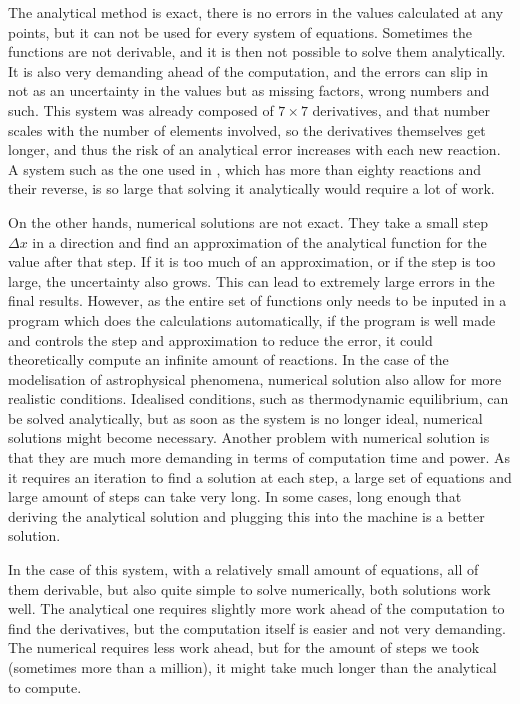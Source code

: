 \documentclass[a4paper, 12pt]{article}
\begin{document}
The analytical method is exact, there is no errors in the values calculated at any points, but it can not be used for every system of equations. Sometimes the functions are not derivable, and it is then not possible to solve them analytically. It is also very demanding ahead of the computation, and the errors can slip in not as an uncertainty in the values but as missing factors, wrong numbers and such. This system was already composed of $7\times 7$ derivatives, and that number scales with the number of elements involved, so the derivatives themselves get longer, and thus the risk of an analytical error increases with each new reaction. A system such as the one used in \cite{wagoner_synthesis_1967}, which has more than eighty reactions and their reverse, is so large that solving it analytically would require a lot of work.

On the other hands, numerical solutions are not exact. They take a small step $\Delta x$ in a direction and find an approximation of the analytical function for the value after that step. If it is too much of an approximation, or if the step is too large, the uncertainty also grows. This can lead to extremely large errors in the final results. However, as the entire set of functions only needs to be inputed in a program which does the calculations automatically, if the program is well made and controls the step and approximation to reduce the error, it could theoretically compute an infinite amount of reactions. In the case of the modelisation of astrophysical phenomena, numerical solution also allow for more realistic conditions. Idealised conditions, such as thermodynamic equilibrium, can be solved analytically, but as soon as the system is no longer ideal, numerical solutions might become necessary. Another problem with numerical solution is that they are much more demanding in terms of computation time and power. As it requires an iteration to find a solution at each step, a large set of equations and large amount of steps can take very long. In some cases, long enough that deriving the analytical solution and plugging this into the machine is a better solution.

In the case of this system, with a relatively small amount of equations, all of them derivable, but also quite simple to solve numerically, both solutions work well. The analytical one requires slightly more work ahead of the computation to find the derivatives, but the computation itself is easier and not very demanding. The numerical requires less work ahead, but for the amount of steps we took (sometimes more than a million), it might take much longer than the analytical to compute. 
\end{document}
